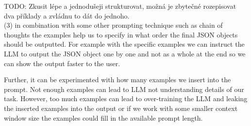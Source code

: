 TODO: Zkusit lépe a jednodušeji strukturovat, možná je zbytečné rozepisovat dva příklady a zvládnu to dát do jednoho. \\

(3) in combination with some other prompting technique such as chain of thoughts the examples help us to specify in what order the final JSON objects should be outputted. For example with the specific examples we can instruct the LLM to output the JSON object one by one and not as a whole at the end so we can show the output faster to the user.

Further, it can be experimented with how many examples we insert into the prompt. Not enough examples can lead to LLM not understanding details of our task. However, too much examples can lead to over-training the LLM and leaking the inserted examples into the output or if we work with some smaller context window size the examples could fill in the available prompt length.